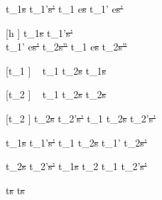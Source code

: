   {t_1\st{s}  t_1'\st{s'}}
  {t_1 \Next e\st{s}  t_1' \Next e\st{s'}}

[h \neq \Execute \pi]
  {t_1\st{s}  t_1'\st{s'}       \\
   t_1' \Then e\st{s'} \normalise t_2\st{s''} }
  {t_1 \Then e\st{s}  t_2\st{s''}}

[t_1 \neq \Fail]
  {\ }
  {t_1 \Xor t_2\st{s} \handle{\Pick \First} t_1\st{s}}

[t_2 \neq \Fail]
  {\ }
  {t_1 \Xor t_2\st{s} \handle{\Pick \Second} t_2\st{s}}

[t_2 \neq \Fail]
  {t_2\st{s} \handle{\Pick \pi} t_2'\st{s'}}
  {t_1 \Xor t_2\st{s} \handle{\Pick \Other \pi} t_2'\st{s'}}

  {t_1\st{s}  t_1'\st{s'} }
  {t_1 \AndOr t_2\st{s}  t_1' \AndOr t_2\st{s'}}

  {t_2\st{s}  t_2'\st{s'} }
  {t_1\st{s} \AndOr t_2  t_1 \AndOr t_2'\st{s'}}

  { }
  {t\st{s}  t\st{s}}
